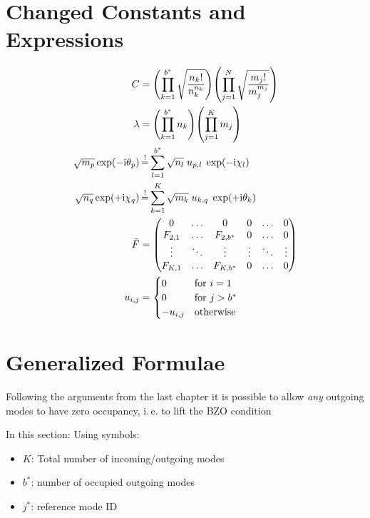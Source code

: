 \documentclass[
	english,
	a4paper,
	fontsize=10pt,
	parskip=half,
	titlepage=true,
	DIV=12,
	final
]{scrreprt}
\newcommand*{\ie}{i.\,e.\xspace}
\newcommand*{\iunit}{\ensuremath{\mathrm{i}}}
\newcommand*{\equalCond}{  \mathop{=}\limits^!  }
\begin{document}
\section{Changed Constants and Expressions}
\begin{align}
	C
&=
	\qty( \prod_{k=1}^{b^*}
		\sqrt{\frac
			{ n_k! }
			{ n_k^{n_k} }
		}
	)
	\qty( \prod_{j=1}^{N}
		\sqrt{\frac
			{ m_j! }
			{ m_j^{m_j} }
		}
	)
\label{eqn:DefC_n}
\\
	\lambda
&=
	\qty( \prod_{k=1}^{b^*} n_k )
	\qty( \prod_{j=1}^{K}   m_j )
\label{eqn:DefLambda_n}
\\
	\sqrt{m_p} \exp(-\iunit \theta_p)
&\equalCond
	\sum_{l=1}^{b^*} \sqrt{n_l} \; u_{p,l} \; \exp(-\iunit\chi_l)
\label{eqn:FourierLinkForward_n}
\\
	\sqrt{n_q} \exp(+\iunit \chi_q)
&\equalCond
	\sum_{k=1}^{K}
	\sqrt{m_k} \; u_{k,q} \; \exp(+\iunit\theta_k)
\label{eqn:FourierLinkBackward_}
\\
	\tilde{F}
&=
	\begin{pmatrix}
		0		& \ldots & 0				& 0		& \ldots & 0 \\
		F_{2,1}	& \ldots & F_{2, b^*}	& 0		& \ldots & 0 \\
		\vdots	& \ddots	 & \vdots		& \vdots	& \ddots & \vdots \\
		F_{K,1} & \ldots & F_{K, b^*}	& 0		& \ldots & 0
	\end{pmatrix}
\label{eqn:DefFTilda_n}
\\
	u_{i,j}
&=
	\begin{cases}
		0			& \text{for } i = 1 \\
		0			& \text{for } j > b^* \\
		-u_{i,j}		& \text{otherwise}
	\end{cases}
\label{eqn:DefUTilda_n}
\end{align}

\section{Generalized Formulae}
Following the arguments from the last chapter it is possible to allow \emph{any} outgoing modes to have zero occupancy, \ie to lift the BZO condition

In this section: Using symbols:
\begin{itemize}
\item $K$: Total number of incoming/outgoing modes
\item $b^*$: number of occupied outgoing modes
\item $j^*$: reference mode ID
\end{itemize}
\end{document}
